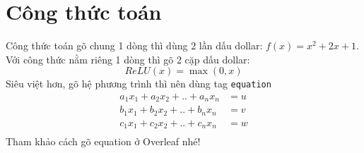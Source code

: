 \section{Công thức toán}
Công thức toán gõ chung 1 dòng thì dùng 2 lần dấu dollar: $f(x) = x^2 + 2x + 1$. Với công thức nằm riêng 1 dòng thì gõ 2 cặp dấu dollar:
$$
ReLU(x) = \max(0, x)
$$
Siêu việt hơn, gõ hệ phương trình thì nên dùng tag \texttt{equation}
\begin{equation*}
\begin{aligned}
a_1x_1 + a_2x_2 + .. + a_nx_n &= u \\
b_1x_1 + b_2x_2 + .. + b_nx_n &= v \\
c_1x_1 + c_2x_2 + .. + c_nx_n &= w \\
\end{aligned}
\end{equation*}
Tham khảo cách gõ equation ở Overleaf nhé!
